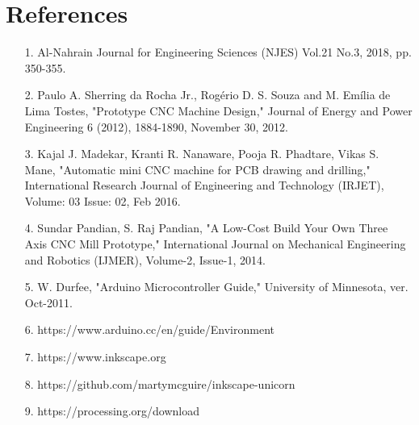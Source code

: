 \documentclass[conference]{IEEEtran}
\begin{document}
\section{References}
\vspace*{10pt}
\begin{enumerate}
    \item [1.] Al-Nahrain Journal for Engineering Sciences (NJES) Vol.21 No.3, 2018, pp. 350-355.
    \item [2.] Paulo A. Sherring da Rocha Jr., Rogério D. S. Souza and M. Emília de Lima Tostes, "Prototype CNC Machine Design," Journal of Energy and Power Engineering 6 (2012), 1884-1890, November 30, 2012.
    \item [3.] Kajal J. Madekar, Kranti R. Nanaware, Pooja R. Phadtare, Vikas S. Mane, "Automatic mini CNC machine for PCB drawing and drilling," International Research Journal of Engineering and Technology (IRJET), Volume: 03 Issue: 02, Feb 2016.
    \item [4.] Sundar Pandian, S. Raj Pandian, "A Low-Cost Build Your Own Three Axis CNC Mill Prototype," International Journal on Mechanical Engineering and Robotics (IJMER), Volume-2, Issue-1, 2014.
    \item [5.] W. Durfee, "Arduino Microcontroller Guide," University of Minnesota, ver. Oct-2011.
    \item [6.] https://www.arduino.cc/en/guide/Environment
    \item [7.] https://www.inkscape.org
    \item [8.] https://github.com/martymcguire/inkscape-unicorn
    \item [9.] https://processing.org/download
\end{enumerate}
\end{document}
